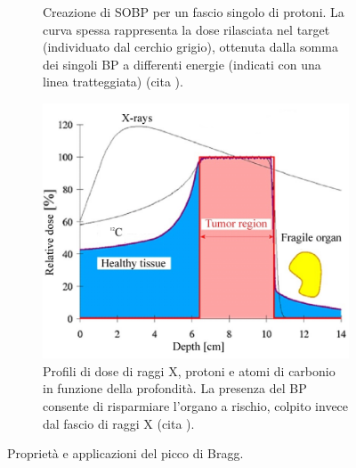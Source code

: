 \documentclass[12pt,a4paper,twoside]{report}
\begin{document}
\begin{figure}[H]
\begin{subfigure}[t]{0.49\textwidth}
			\caption{Creazione di SOBP per un fascio singolo di protoni. La curva spessa rappresenta la dose rilasciata nel target (individuato dal cerchio grigio), ottenuta dalla somma dei singoli BP a differenti energie (indicati con una linea tratteggiata) (cita
				).}
			\label{fig:sobp}
		\end{subfigure}
		\par
		\begin{subfigure}[t]{0.49\textwidth}
			\centering
			\includegraphics[width=\textwidth, scale=0.50]{critical_organ.jpg}
			\caption{Profili di dose di raggi X, protoni e atomi di carbonio in funzione della profondità. La presenza del BP consente di risparmiare l'organo a rischio, colpito invece dal fascio di raggi X (cita
				).}
			\label{fig:critical_organ}
		\end{subfigure}
		\caption{Proprietà e applicazioni del picco di Bragg.}
	\end{figure}
\end{document}
